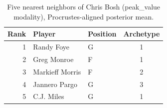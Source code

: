 \begin{table}[htbp]
  \centering\small
  \begin{tabular}{rllc}
    \toprule
    Rank & Player & Position & Archetype \\
    \midrule
    1 & Randy Foye & G & 1 \\
    2 & Greg Monroe & F & 1 \\
    3 & Markieff Morris & F & 2 \\
    4 & Jannero Pargo & G & 3 \\
    5 & C.J. Miles & G & 1 \\
    \bottomrule
  \end{tabular}
  \caption{Five nearest neighbors of Chris Bosh (peak_value modality), Procrustes-aligned posterior mean.}
  \label{tab:Chris_Bosh_neighbors_peak_value}
\end{table}

